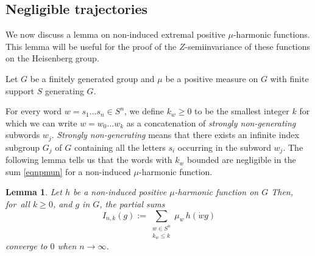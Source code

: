 \documentclass[JEP,XML,SOM,Unicode]{cedram}
\newtheorem{Lem}[Thm]{Lemma}
\theoremstyle{definition}
\let\bq\relax
\let\eq\relax
\let\ra\to
\begin{document}
\subsection{Negligible trajectories}
\label{secnegtra}
\bq
We now discuss a lemma on non-induced extre\-mal positive $\mu$-harmonic functions.
This lemma will be useful for the proof of the $Z$\nobreakdash-semiinvariance
of these functions on the Heisenberg group.
\eq

Let $G$ be a finitely generated group
and $\mu$ be a positive measure on $G$ with finite support $S$
generating $G$.

For every word $w=s_1\ldots s_n\in S^n$, we define
$k_w\geq 0 $ to be the smallest integer $k$ for which we can
write $w=w_0\ldots w_k$ as a concatenation of \emph{strongly non-generating} subwords $w_j$.
\emph{Strongly non-generating} means that
there exists an infinite index subgroup $G_j$ of $G$
containing all the letters $s_i$ occurring
in the subword $w_j$.
The following lemma tells us that the words with $k_w$ bounded
are negligible
in the sum \eqref{eqnpmun} for a non-induced $\mu$-harmonic function.

\begin{Lem}
\label{lemnegtra}
Let $h$ be a non-induced positive $\mu$-harmonic function on $G$
Then, for~all $k\geq 0$, and $g$ in $G$, the partial sums
\begin{equation}
\label{eqnlimsumhgg}
I_{n,k}(g):=\sum_{\substack{w\in S^n\\ k_w\leq k}} \mu_w\, h(\dot{w}g)
\end{equation}
converge to $0$ when $n\ra\infty$.
\end{Lem}
\end{document}
